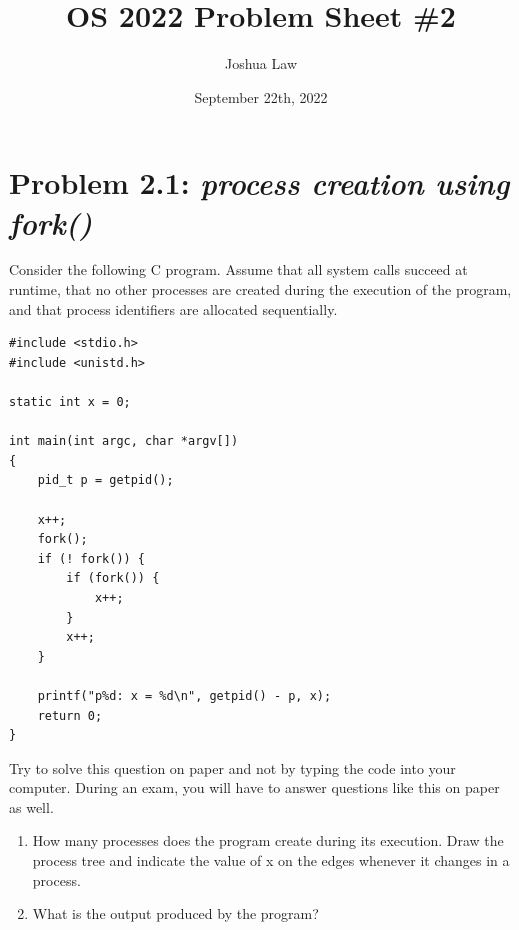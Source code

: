 \documentclass[
	12pt, %
]{fphw}
\title{OS 2022 Problem Sheet \#2} %
\author{Joshua Law} %
\date{September 22th, 2022} %
\institute{Jacobs University Bremen \\ Bachelor Of Computer Science} %
\begin{document}
\maketitle %


\section*{Problem 2.1: \emph{process creation using fork() }}

\begin{problem}
Consider the following C program. Assume that all system calls succeed at runtime, that no other
processes are created during the execution of the program, and that process identifiers are allocated sequentially.\end{problem}

\begin{lstlisting}[style=CStyle]
#include <stdio.h>
#include <unistd.h>

static int x = 0;

int main(int argc, char *argv[])
{
	pid_t p = getpid();

	x++;
	fork();
	if (! fork()) {
		if (fork()) {
			x++;
		}
		x++;
	}

	printf("p%d: x = %d\n", getpid() - p, x);
	return 0;
}
\end{lstlisting}
Try to solve this question on paper and not by typing the code into your computer. During an exam, you will have to answer questions like this on paper as well.

\begin{enumerate}
	\item How many processes does the program create during its execution. Draw the process tree and indicate the value of x on the edges whenever it changes in a process.
	\item What is the output produced by the program?
\end{enumerate}
\end{document}
